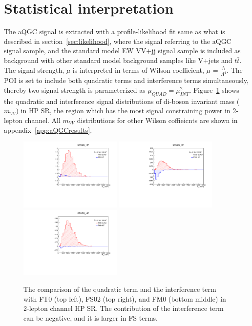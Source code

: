 \section{Statistical interpretation}
The aQGC signal is extracted with a profile-likelihood fit same as what is described in section~\ref{sec:likelihood}, where the signal referring to the aQGC signal sample, and the standard model EW VV+jj signal sample is included as background with other standard model background samples like V+jets and $t\bar{t}$.
The signal strength, $\mu$ is interpreted in terms of Wilson coefficient, $\mu$ = $\frac{f_i}{\Lambda^4}$. 
The POI is set to include both quadratic terms and interference terms simultaneously, thereby two signal strength is parameterized as $\mu_{QUAD} = \mu_{INT}^2$.
Figure~\ref{fig:quadint} shows the quadratic and interference signal distributions of di-boson invariant mass ($m_{VV}$) in HP SR, the region which has the most signal constraining power in 2-lepton channel.
All $m_{VV}$ distributions for other Wilson coffieicnts are shown in appendix~\ref{app:aQGCresults}.  
\begin{figure}[ht]
    \centering
        \includegraphics[width=0.45\textwidth]{figures/aQGC/FT0_0ptag1pfat0pjet_0ptv_SRVBS_HP_MllJ.pdf}
    	\includegraphics[width=0.45\textwidth]{figures/aQGC/FS02_0ptag1pfat0pjet_0ptv_SRVBS_HP_MllJ.pdf}
        \includegraphics[width=0.45\textwidth]{figures/aQGC/FM0_0ptag1pfat0pjet_0ptv_SRVBS_HP_MllJ.pdf}
        \caption{The comparison of the quadratic term and the interference term with FT0 (top left), FS02 (top right), and FM0 (bottom middle) in 2-lepton channel HP SR. The contribution of the interference term can be negative, and it is larger in FS terms. }
        \label{fig:quadint}
\end{figure}
